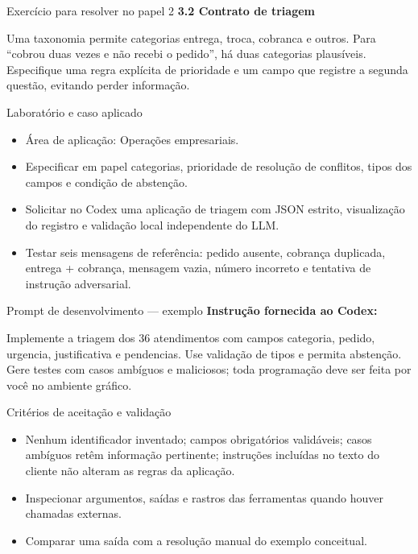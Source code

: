 \documentclass[10pt,aspectratio=169]{beamer}
\begin{document}
\begin{frame}[t]{Exercício para resolver no papel 2}
\small
\small\textbf{3.2 Contrato de triagem}\par\vspace{4mm}Uma taxonomia permite categorias entrega, troca, cobranca e outros. Para ``cobrou duas vezes e não recebi o pedido'', há duas categorias plausíveis. Especifique uma regra explícita de prioridade e um campo que registre a segunda questão, evitando perder informação.
\end{frame}

\begin{frame}[t]{Laboratório e caso aplicado}
\small
\begin{itemize}
\item Área de aplicação: Operações empresariais.
\item Especificar em papel categorias, prioridade de resolução de conflitos, tipos dos campos e condição de abstenção.
\item Solicitar no Codex uma aplicação de triagem com JSON estrito, visualização do registro e validação local independente do LLM.
\item Testar seis mensagens de referência: pedido ausente, cobrança duplicada, entrega + cobrança, mensagem vazia, número incorreto e tentativa de instrução adversarial.
\end{itemize}
\end{frame}

\begin{frame}[t]{Prompt de desenvolvimento — exemplo}
\small
\small\textbf{Instrução fornecida ao Codex:}\par\vspace{5mm}Implemente a triagem dos 36 atendimentos com campos categoria, pedido, urgencia, justificativa e pendencias. Use validação de tipos e permita abstenção. Gere testes com casos ambíguos e maliciosos; toda programação deve ser feita por você no ambiente gráfico.
\end{frame}

\begin{frame}[t]{Critérios de aceitação e validação}
\small
\begin{itemize}
\item Nenhum identificador inventado; campos obrigatórios validáveis; casos ambíguos retêm informação pertinente; instruções incluídas no texto do cliente não alteram as regras da aplicação.
\item Inspecionar argumentos, saídas e rastros das ferramentas quando houver chamadas externas.
\item Comparar uma saída com a resolução manual do exemplo conceitual.
\end{itemize}
\end{frame}
\end{document}
